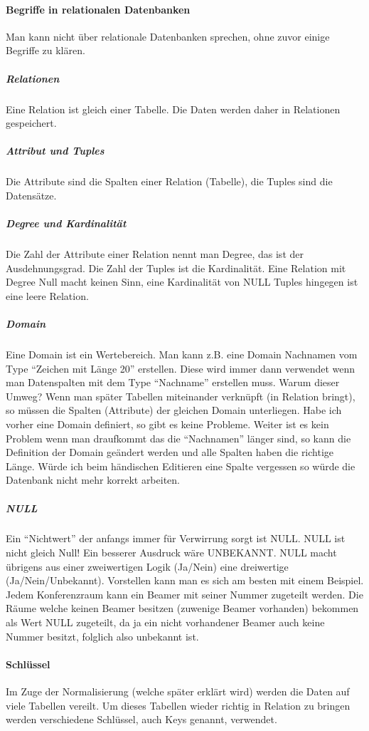 \paragraph{Begriffe in relationalen Datenbanken}
Man kann nicht über relationale Datenbanken sprechen, ohne zuvor einige Begriffe zu klären.

\subparagraph{Relationen}
Eine Relation ist gleich einer Tabelle. Die Daten werden daher in Relationen gespeichert.

\subparagraph{Attribut und Tuples}
Die Attribute sind die Spalten einer Relation (Tabelle), die Tuples sind die Datensätze.

\subparagraph{Degree und Kardinalität}\label{Kardinalitaet}
Die Zahl der Attribute einer Relation nennt man Degree, das ist der Ausdehnungsgrad. Die Zahl der Tuples ist die Kardinalität.
Eine Relation mit Degree Null macht keinen Sinn, eine Kardinalität von NULL Tuples hingegen ist eine leere Relation.

\subparagraph{Domain}
Eine Domain ist ein Wertebereich. Man kann z.B. eine Domain Nachnamen vom Type "`Zeichen mit Länge 20"' erstellen. Diese wird immer dann verwendet wenn man Datenspalten mit dem Type "`Nachname"' erstellen muss. Warum dieser Umweg? Wenn man später Tabellen miteinander verknüpft (in Relation bringt), so müssen die Spalten (Attribute) der gleichen Domain unterliegen. Habe ich vorher eine Domain definiert, so gibt es keine Probleme. Weiter ist es kein Problem wenn man draufkommt das die "`Nachnamen"' länger sind, so kann die Definition der Domain geändert werden und alle Spalten haben die richtige Länge. Würde ich beim händischen Editieren eine Spalte vergessen so würde die Datenbank nicht mehr korrekt arbeiten.

\subparagraph{NULL}
Ein "`Nichtwert"' der anfangs immer für Verwirrung sorgt ist NULL. NULL ist nicht gleich Null! Ein besserer Ausdruck wäre UNBEKANNT. NULL macht übrigens aus einer zweiwertigen Logik (Ja/Nein) eine dreiwertige (Ja/Nein/Unbekannt). 
Vorstellen kann man es sich am besten mit einem Beispiel. Jedem Konferenzraum kann ein Beamer mit seiner Nummer zugeteilt werden. Die Räume welche keinen Beamer besitzen (zuwenige Beamer vorhanden) bekommen als Wert NULL zugeteilt, da ja ein nicht vorhandener Beamer auch keine Nummer besitzt, folglich also unbekannt ist.

\paragraph{Schlüssel}\label{Schluessel}
Im Zuge der Normalisierung (welche später erklärt wird) werden die Daten auf viele Tabellen vereilt. Um dieses Tabellen wieder richtig in Relation zu bringen werden verschiedene Schlüssel, auch Keys genannt, verwendet.

